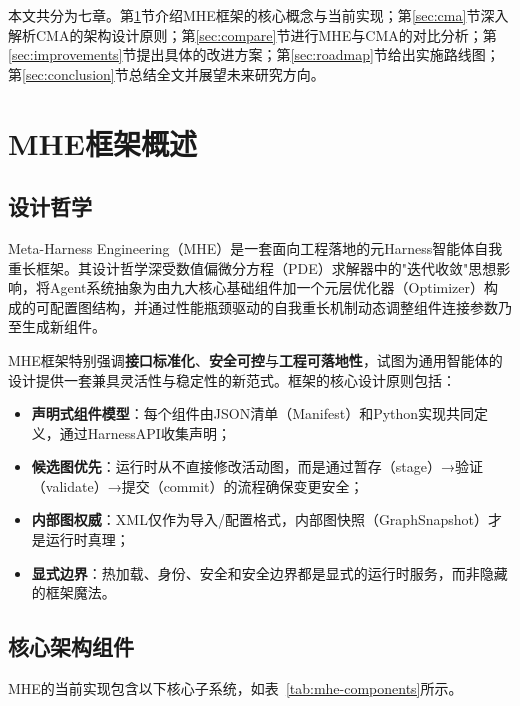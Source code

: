 \documentclass[12pt,a4paper]{ctexart}
\begin{document}
本文共分为七章。第\ref{sec:mhe}节介绍MHE框架的核心概念与当前实现；第\ref{sec:cma}节深入解析CMA的架构设计原则；第\ref{sec:compare}节进行MHE与CMA的对比分析；第\ref{sec:improvements}节提出具体的改进方案；第\ref{sec:roadmap}节给出实施路线图；第\ref{sec:conclusion}节总结全文并展望未来研究方向。

\section{MHE框架概述}\label{sec:mhe}

\subsection{设计哲学}

Meta-Harness Engineering（MHE）是一套面向工程落地的元Harness智能体自我重长框架。其设计哲学深受数值偏微分方程（PDE）求解器中的"迭代收敛"思想影响，将Agent系统抽象为由九大核心基础组件加一个元层优化器（Optimizer）构成的可配置图结构，并通过性能瓶颈驱动的自我重长机制动态调整组件连接参数乃至生成新组件。

MHE框架特别强调\textbf{接口标准化}、\textbf{安全可控}与\textbf{工程可落地性}，试图为通用智能体的设计提供一套兼具灵活性与稳定性的新范式。框架的核心设计原则包括：

\begin{itemize}
    \item \textbf{声明式组件模型}：每个组件由JSON清单（Manifest）和Python实现共同定义，通过HarnessAPI收集声明；
    \item \textbf{候选图优先}：运行时从不直接修改活动图，而是通过暂存（stage）→验证（validate）→提交（commit）的流程确保变更安全；
    \item \textbf{内部图权威}：XML仅作为导入/配置格式，内部图快照（GraphSnapshot）才是运行时真理；
    \item \textbf{显式边界}：热加载、身份、安全和安全边界都是显式的运行时服务，而非隐藏的框架魔法。
\end{itemize}

\subsection{核心架构组件}

MHE的当前实现包含以下核心子系统，如表~\ref{tab:mhe-components}所示。
\end{document}
